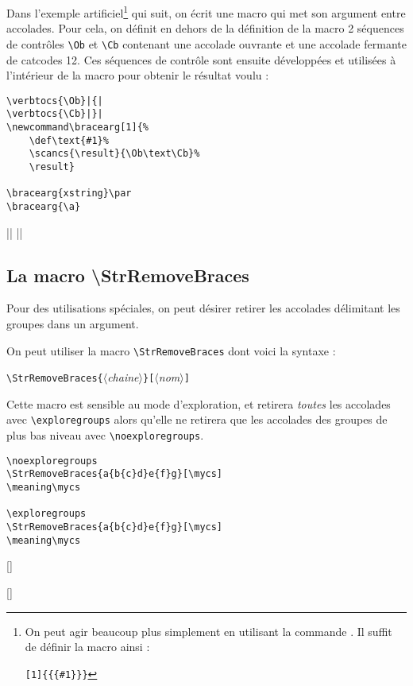 \documentclass[a4paper,10pt,french]{article}
\newcommand\argu[1]{$\langle$\textit{#1}$\rangle$}
\newcommand\ARGU[1]{\texttt{\color{black}\{}\argu{#1}\texttt{\color{black}\}}}
\newcommand\arguC[1]{\texttt{\color{black}[}\argu{#1}\texttt{\color{black}]}}
\newcommand\styleexercice{\footnotesize}
\newcommand\verbinline{\lstinline[basicstyle=\normalsize\ttfamily]}
\begin{document}
Dans l'exemple artificiel\footnote{On peut agir beaucoup plus simplement en utilisant la commande \texttt{\string\detokenize}. Il suffit de définir la macro ainsi :\par\texttt{\string\newcommand\string\bracearg[1]\{\string\detokenize\{\{\#1\}\}\}}} qui suit, on écrit une macro qui met son argument entre accolades. Pour cela, on définit en dehors de la définition de la macro 2 séquences de contrôles \verb|\Ob| et \verb|\Cb| contenant une accolade ouvrante et une accolade fermante de catcodes 12. Ces séquences de contrôle sont ensuite développées et utilisées à l'intérieur de la macro pour obtenir le résultat voulu :\par\nobreak\medskip
\begin{minipage}[c]{0.65\linewidth}
\begin{lstlisting}
\verbtocs{\Ob}|{|
\verbtocs{\Cb}|}|
\newcommand\bracearg[1]{%
	\def\text{#1}%
	\scancs{\result}{\Ob\text\Cb}%
	\result}

\bracearg{xstring}\par
\bracearg{\a}
\end{lstlisting}%
\end{minipage}\hfill
\begin{minipage}[c]{0.35\linewidth}
	\styleexercice
	\verbtocs{\Ob}|{|
	\verbtocs{\Cb}|}|
	\newcommand\bracearg[1]{%
		\def\text{#1}%
		\scancs{\result}{\Ob\text\Cb}%
		\result}

	\bracearg{xstring}\par
	\bracearg{\a}
\end{minipage}%

\subsection{La macro \ttfamily\textbackslash StrRemoveBraces}
Pour des utilisations spéciales, on peut désirer retirer les accolades délimitant les groupes dans un argument.

On peut utiliser la macro \verbinline|\StrRemoveBraces| dont voici la syntaxe :\par\nobreak\smallskip
\verbinline|\StrRemoveBraces|\ARGU{chaine}\arguC{nom}
\smallskip

Cette macro est sensible au mode d'exploration, et retirera \emph{toutes} les accolades avec \verbinline|\exploregroups| alors qu'elle ne retirera que les accolades des groupes de plus bas niveau avec \verbinline|\noexploregroups|.\medskip

\begin{minipage}[c]{0.65\linewidth}
\begin{lstlisting}
\noexploregroups
\StrRemoveBraces{a{b{c}d}e{f}g}[\mycs]
\meaning\mycs

\exploregroups
\StrRemoveBraces{a{b{c}d}e{f}g}[\mycs]
\meaning\mycs
\end{lstlisting}%
\end{minipage}\hfill
\begin{minipage}[c]{0.35\linewidth}
	\styleexercice
	\noexploregroups
	[\mycs]
	\meaning\mycs

	\exploregroups
	[\mycs]
	\meaning\mycs
\end{minipage}%
\end{document}

